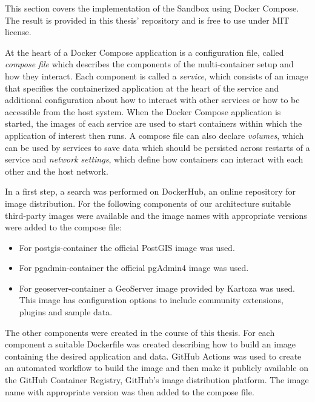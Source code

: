 \documentclass[11pt, a4paper, oneside, parskip=full-]{scrartcl}
\begin{document}
This section covers the implementation of the Sandbox using Docker Compose. The
result is provided in this thesis' repository\cite{osgeostacksandbox} and is
free to use under MIT license.

At the heart of a Docker Compose application is a configuration file, called
\emph{compose file} which describes the components of the multi-container setup
and how they interact. Each component is called a \emph{service}, which consists
of an image that specifies the containerized application at the heart of the
service and additional configuration about how to interact with other services
or how to be accessible from the host system. When the Docker Compose
application is started, the images of each service are used to start containers
within which the application of interest then runs. A compose file can also
declare \emph{volumes}, which can be used by services to save data which should
be persisted across restarts of a service and \emph{network settings}, which
define how containers can interact with each other and the host network.

In a first step, a search was performed on DockerHub\cite{dockerhub}, an online
repository for image distribution. For the following components of our
architecture suitable third-party images were available and the image names with
appropriate versions were added to the compose file:

\begin{itemize}
  \item For postgis-container the official PostGIS image was
  used\cite{postgis-container}.
  \item For pgadmin-container the official pgAdmin4 image was
  used\cite{pgadmin-container}.
  \item For geoserver-container a GeoServer image provided by Kartoza was
  used\cite{geoserver-container}. This image has configuration options to
  include community extensions, plugins and sample data.
\end{itemize}

The other components were created in the course of this thesis. For each
component a suitable Dockerfile was created describing how to build an image
containing the desired application and data. GitHub Actions\cite{githubactions}
was used to create an automated workflow to build the image and then make it
publicly available on the GitHub Container Registry\cite{gcr}, GitHub's image
distribution platform. The image name with appropriate version was then added to
the compose file.
\end{document}
